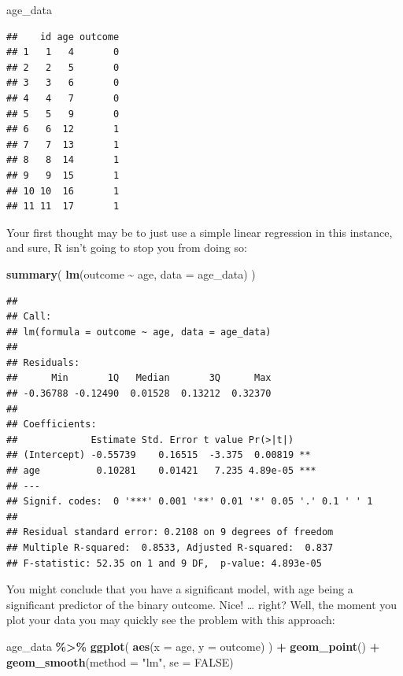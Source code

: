 \documentclass[
]{book}
\newenvironment{Shaded}{\begin{snugshade}}{\end{snugshade}}
\newcommand{\AttributeTok}[1]{\textcolor[rgb]{0.13,0.29,0.53}{#1}}
\newcommand{\ConstantTok}[1]{\textcolor[rgb]{0.56,0.35,0.01}{#1}}
\newcommand{\FunctionTok}[1]{\textcolor[rgb]{0.13,0.29,0.53}{\textbf{#1}}}
\newcommand{\NormalTok}[1]{#1}
\newcommand{\SpecialCharTok}[1]{\textcolor[rgb]{0.81,0.36,0.00}{\textbf{#1}}}
\newcommand{\StringTok}[1]{\textcolor[rgb]{0.31,0.60,0.02}{#1}}
\begin{document}
\begin{Shaded}
\begin{Highlighting}[]
\NormalTok{age\_data}
\end{Highlighting}
\end{Shaded}

\begin{verbatim}
##    id age outcome
## 1   1   4       0
## 2   2   5       0
## 3   3   6       0
## 4   4   7       0
## 5   5   9       0
## 6   6  12       1
## 7   7  13       1
## 8   8  14       1
## 9   9  15       1
## 10 10  16       1
## 11 11  17       1
\end{verbatim}

Your first thought may be to just use a simple linear regression in this instance, and sure, R isn't going to stop you from doing so:

\begin{Shaded}
\begin{Highlighting}[]
\FunctionTok{summary}\NormalTok{(}
  \FunctionTok{lm}\NormalTok{(outcome }\SpecialCharTok{\textasciitilde{}}\NormalTok{ age, }\AttributeTok{data =}\NormalTok{ age\_data)}
\NormalTok{)}
\end{Highlighting}
\end{Shaded}

\begin{verbatim}
## 
## Call:
## lm(formula = outcome ~ age, data = age_data)
## 
## Residuals:
##      Min       1Q   Median       3Q      Max 
## -0.36788 -0.12490  0.01528  0.13212  0.32370 
## 
## Coefficients:
##             Estimate Std. Error t value Pr(>|t|)    
## (Intercept) -0.55739    0.16515  -3.375  0.00819 ** 
## age          0.10281    0.01421   7.235 4.89e-05 ***
## ---
## Signif. codes:  0 '***' 0.001 '**' 0.01 '*' 0.05 '.' 0.1 ' ' 1
## 
## Residual standard error: 0.2108 on 9 degrees of freedom
## Multiple R-squared:  0.8533, Adjusted R-squared:  0.837 
## F-statistic: 52.35 on 1 and 9 DF,  p-value: 4.893e-05
\end{verbatim}

You might conclude that you have a significant model, with age being a significant predictor of the binary outcome. Nice! \ldots{} right? Well, the moment you plot your data you may quickly see the problem with this approach:

\begin{Shaded}
\begin{Highlighting}[]
\NormalTok{age\_data }\SpecialCharTok{\%\textgreater{}\%}
  \FunctionTok{ggplot}\NormalTok{(}
    \FunctionTok{aes}\NormalTok{(}\AttributeTok{x =}\NormalTok{ age, }\AttributeTok{y =}\NormalTok{ outcome)}
\NormalTok{  ) }\SpecialCharTok{+}
  \FunctionTok{geom\_point}\NormalTok{() }\SpecialCharTok{+}
  \FunctionTok{geom\_smooth}\NormalTok{(}\AttributeTok{method =} \StringTok{"lm"}\NormalTok{, }\AttributeTok{se =} \ConstantTok{FALSE}\NormalTok{)}
\end{Highlighting}
\end{Shaded}
\end{document}
